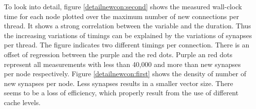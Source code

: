To look into detail, figure \ref{detailnewcon:second} shows the measured wall-clock time for each node
plotted over the maximum number of new connections per thread. It shows a strong correlation between the variable and
the duration. Thus the increasing variations of timings can be explained by the variations of synapses per thread.
The figure indicates two different timings per connection. There is an offset of regression between the purple
and the red dots. Purple an red dots represent all measurements with less than 40,000 and more than new synapses per
node respectively. Figure \ref{detailnewcon:first} shows the density of number of new synapses per node.
Less synapses results in a smaller vector size. There seems to be a loss of efficiency, which properly result from
the use of different cache levels. 

\begin{figure}[ht!]
     \begin{center}
\end{center}
\end{figure}
